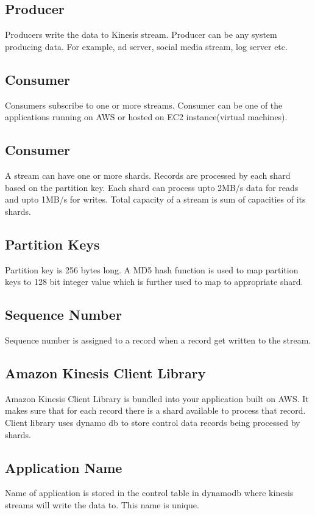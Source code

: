 \documentclass[9pt,twocolumn,twoside]{../../styles/osajnl}
\begin{document}
\subsection{Producer}
Producers write the data to Kinesis stream. Producer can be any system producing
data. For example, ad server, social media stream, log server etc.

\subsection{Consumer}
Consumers subscribe to one or more streams.  Consumer can be one of the
applications  running on AWS or hosted on EC2 \CE instance(virtual machines).

\subsection{Consumer}
A stream can have one or more shards. Records are processed by each shard based
on the partition key. Each shard can process upto \SE 2MB/s data for reads
and upto \SE
1MB/s for writes. Total capacity of a stream is sum of capacities of its shards.
\subsection{Partition Keys}
Partition key is 256 bytes long. A MD5 \CE hash function is used to map partition
keys to 128 bit integer value which is further used to map to appropriate shard.

\subsection{Sequence Number}
Sequence number is assigned to a record when a record get written to the stream.

\subsection{Amazon Kinesis Client Library}
Amazon Kinesis Client Library is bundled into your application built on AWS. It
makes sure that for each record there is a shard available to process that
record.  Client library uses dynamo db \CE to store control data records being
processed by shards.

\subsection{Application Name}
Name of application is stored in the control table in dynamodb where kinesis
streams will write the data to. This name is unique.
\end{document}
